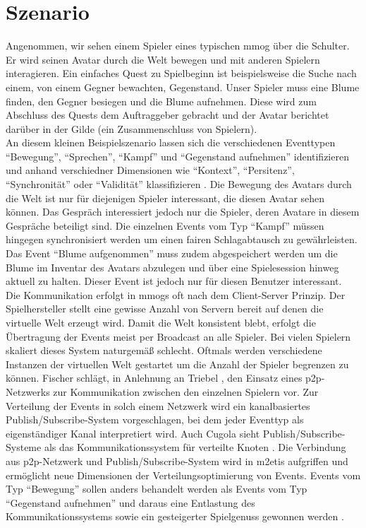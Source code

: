 \section{Szenario}
\label{chap:grundlagen:szenario}
Angenommen, wir sehen einem Spieler eines typischen \ac{mmog} über die Schulter. Er wird seinen Avatar durch die Welt bewegen und mit anderen Spielern interagieren. Ein einfaches Quest zu Spielbeginn ist beispielsweise die Suche nach einem, von einem Gegner bewachten, Gegenstand. Unser Spieler muss eine Blume finden, den Gegner besiegen und die Blume aufnehmen. Diese wird zum Abschluss des Quests dem Auftraggeber gebracht und der Avatar berichtet darüber in der Gilde (ein Zusammenschluss von Spielern).\\
An diesem kleinen Beispielszenario lassen sich die verschiedenen Eventtypen ``Bewegung'', ``Sprechen'', ``Kampf'' und ``Gegenstand aufnehmen'' identifizieren und anhand verschiedner Dimensionen wie ``Kontext'', ``Persitenz'', ``Synchronität'' oder ``Validität'' klassifizieren \cite{Fischer2010Event}. Die Bewegung des Avatars durch die Welt ist nur für diejenigen Spieler interessant, die diesen Avatar sehen können. Das Gespräch interessiert jedoch nur die Spieler, deren Avatare in diesem Gespräche beteiligt sind. Die einzelnen Events vom Typ ``Kampf'' müssen hingegen synchronisiert werden um einen fairen Schlagabtausch zu gewährleisten. Das Event ``Blume aufgenommen'' muss zudem abgespeichert werden um die Blume im Inventar des Avatars abzulegen und über eine Spielesession hinweg aktuell zu halten. Dieser Event ist jedoch nur für diesen Benutzer interessant.\\
Die Kommunikation erfolgt in \acp{mmog} oft nach dem Client-Server Prinzip. Der Spielhersteller stellt eine gewisse Anzahl von Servern bereit auf denen die virtuelle Welt erzeugt wird. Damit die Welt konsistent blebt, erfolgt die Übertragung der Events meist per Broadcast an alle Spieler. Bei vielen Spielern skaliert dieses System naturgemäß schlecht. Oftmals werden verschiedene Instanzen der virtuellen Welt gestartet um die Anzahl der Spieler begrenzen zu können. Fischer schlägt, in Anlehnung an Triebel \cite{Triebel2008Peertopeer}, den Einsatz eines \ac{p2p}-Netzwerks zur Kommunikation zwischen den einzelnen Spielern vor. Zur Verteilung der Events in solch einem Netzwerk wird ein kanalbasiertes Publish/Subscribe-System vorgeschlagen, bei dem jeder Eventtyp als eigenständiger Kanal interpretiert wird. Auch Cugola sieht Publish/Subscribe-Systeme als das Kommunikationssystem für verteilte Knoten \cite{Cugola2002Using}. Die Verbindung aus \ac{p2p}-Netzwerk und Publish/Subscribe-System wird in \ac{m2etis} aufgriffen und ermöglicht neue Dimensionen der Verteilungsoptimierung von Events. Events vom Typ ``Bewegung'' sollen anders behandelt werden als Events vom Typ ``Gegenstand aufnehmen'' und daraus eine Entlastung des Kommunikationssystems sowie ein gesteigerter Spielgenuss gewonnen werden  \cite{Fischer2010a}.
